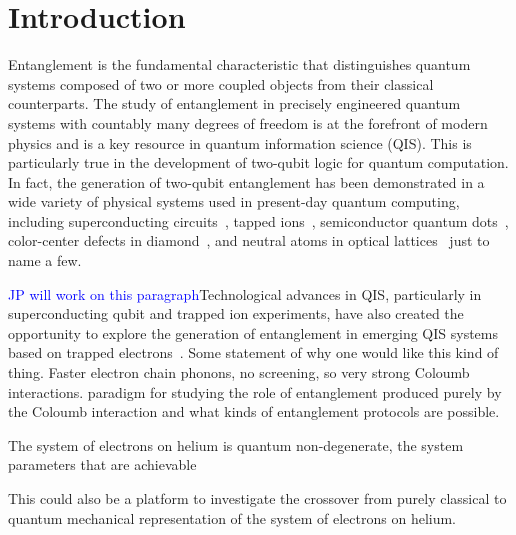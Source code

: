 \documentclass[twocolumn,superscriptaddress,unsortedaddress,
 amsmath,amssymb,
 aps,
]{revtex4-2}
\begin{document}
\section{Introduction} %
Entanglement is the fundamental characteristic that distinguishes
quantum systems composed of two or more coupled objects from their classical counterparts. The study of entanglement in precisely engineered quantum systems with countably many degrees of freedom is at the forefront of modern physics and is a key resource in quantum information science (QIS). This is particularly true in the development of two-qubit logic for quantum computation. In fact, the generation of two-qubit entanglement has been demonstrated in a wide variety of physical systems used in present-day quantum computing, including superconducting circuits~\cite{Steffen1423}, tapped ions~\cite{}, semiconductor quantum dots~\cite{Li809}, color-center defects in diamond~\cite{}, and neutral atoms in optical lattices~\cite{Saffman1010} just to name a few.

\textcolor{blue}{JP will work on this paragraph}Technological advances in QIS, particularly in superconducting qubit and trapped ion experiments, have also created the opportunity to explore the generation of entanglement in emerging QIS systems based on trapped electrons~{}. Some statement of why one would like this kind of thing. Faster electron chain phonons, no screening, so very strong Coloumb interactions. paradigm for studying the role of entanglement produced purely by the Coloumb interaction and what kinds of entanglement protocols are possible.

The system of electrons on helium is quantum non-degenerate, the system parameters that are achievable 

This could also be a platform to investigate the crossover from purely classical to quantum mechanical representation of the system of electrons on helium. 
\end{document}
